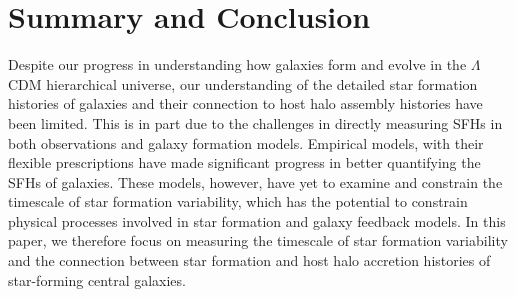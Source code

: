 \documentclass[12pt, letterpaper, preprint, tighten]{aastex62}
\newcommand{\edt}[1]{{\color{dred}{\bf} #1}}
\newcommand{\logsfr}{\log\mathrm{SFR}}
\begin{document}


\section{Summary and Conclusion} \label{sec:summary}
Despite our progress in understanding how galaxies form and evolve in
the $\Lambda$CDM  hierarchical universe, our understanding of the
detailed star formation histories of galaxies and their connection to host
halo assembly histories have been limited. This is in part due to the
challenges in directly measuring SFHs in both observations and galaxy
formation models. Empirical models, with their flexible prescriptions
have made significant progress in better quantifying the SFHs of galaxies.
These models, however, have yet to examine and constrain the timescale of
star formation variability, which has the potential to constrain physical
processes involved in star formation and galaxy feedback models. In this
paper, we therefore focus on measuring the timescale of star formation 
variability and the connection between star formation and host
halo accretion histories of star-forming central galaxies.
\end{document}

